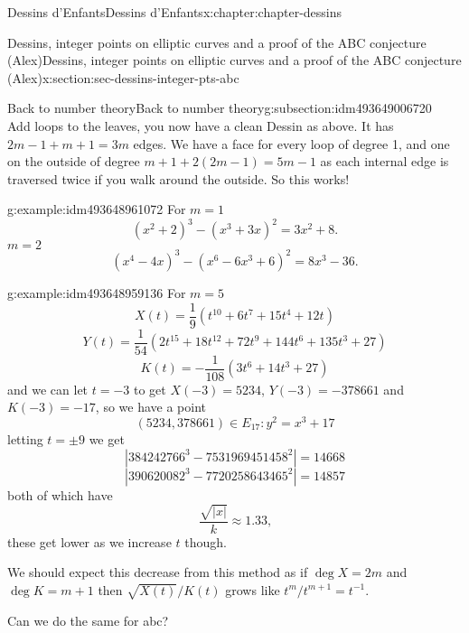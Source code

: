 \documentclass[oneside,10pt,]{book}
\numberwithin{equation}{section}
\newcommand{\inv}{^{-1}}
\begin{document}
\begin{chapterptx}{Dessins d'Enfants}{}{Dessins d'Enfants}{}{}{x:chapter:chapter-dessins}
\begin{sectionptx}{Dessins, integer points on elliptic curves and a proof of the ABC conjecture (Alex)}{}{Dessins, integer points on elliptic curves and a proof of the ABC conjecture (Alex)}{}{}{x:section:sec-dessins-integer-pts-abc}
\begin{subsectionptx}{Back to number theory}{}{Back to number theory}{}{}{g:subsection:idm493649006720}
\begin{equation*}
\end{equation*}
Add loops to the leaves, you now have a clean Dessin as above. It has \(2m- 1 + m + 1 = 3m\) edges. We have a face for every loop of degree 1, and one on the outside of degree \(m+ 1 +2(2m-1)  = 5m - 1\) as each internal edge is traversed twice if you walk around the outside. So this works!%
\begin{example}{}{g:example:idm493648961072}%
For \(m= 1\)%
\begin{equation*}
(x^2 + 2)^3 - (x^3 + 3x)^2 = 3x^2 + 8\text{.}
\end{equation*}
\(m= 2\)%
\begin{equation*}
(x^4 - 4x)^3 - (x^6 -6x^3+6)^2  = 8x^3 - 36\text{.}
\end{equation*}
%
\end{example}
\begin{example}{}{g:example:idm493648959136}%
For \(m =5\)%
\begin{equation*}
X(t) = \frac 19 (t^{10} + 6t^7 +15 t^4 + 12t)
\end{equation*}
%
\begin{equation*}
Y(t) = \frac{1}{54} (2t^{15} + 18t^{12} +72 t^9 + 144 t^6 + 135 t^3 + 27)
\end{equation*}
%
\begin{equation*}
K(t) = -\frac{1}{108} (3t^{6} + 14t^3 +27)
\end{equation*}
and we can let \(t = -3\) to get \(X(-3) = 5234\), \(Y(-3) = -378661\) and \(K(-3) = -17\), so we have a point%
\begin{equation*}
(5234, 378661) \in E_{17} \colon y^2 = x^3 + 17
\end{equation*}
letting \(t = \pm 9\) we get%
\begin{equation*}
|384242766^3 - 7531969451458^2| = 14668
\end{equation*}
%
\begin{equation*}
|390620082^3 - 7720258643465^2| = 14857
\end{equation*}
both of which have%
\begin{equation*}
\frac{\sqrt{|x|}}{k} \approx 1.33\text{,}
\end{equation*}
these get lower as we increase \(t\) though.%
\end{example}
We should expect this decrease from this method as if \(\deg X = 2m\) and \(\deg K = m + 1\) then \(\sqrt{X(t)}/K(t)\) grows like \(t^{m}/t^{m+1} = t\inv\).%
\par
Can we do the same for abc?%
\par

\end{subsectionptx}
\end{sectionptx}
\end{chapterptx}
\end{document}
